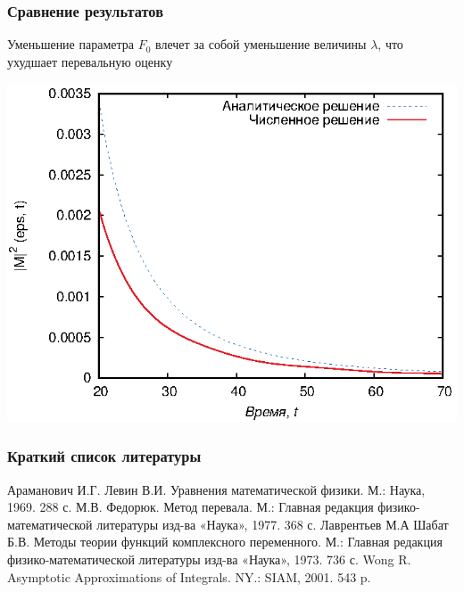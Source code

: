 \documentclass{beamer}
\begin{document}
\frame
{
	\frametitle{Сравнение результатов}
	Уменьшение параметра $F_0$ влечет за собой уменьшение величины $\lambda$, что ухудшает перевальную оценку
	
	\begin{center}
		\includegraphics{end3}  
	\end{center}	
}

\frame
{
	\titlepage 
	\small{}
} 

\frame
{
	\frametitle{Краткий список литературы}
	\begin{thebibliography}{}
		  Араманович И.Г. Левин В.И. Уравнения математической физики. М.: Наука, 1969. 288 с.
		  М.В. Федорюк. Метод перевала. М.: Главная редакция физико-математической литературы изд-ва «Наука», 1977. 368 с.
		  Лаврентьев М.А Шабат Б.В. Методы теории функций комплексного переменного. М.: Главная редакция физико-математической литературы изд-ва «Наука», 1973. 736 с.
		  Wong R. Asymptotic Approximations of Integrals. NY.: SIAM, 2001. 543 p.
	\end{thebibliography}
}
\end{document}
